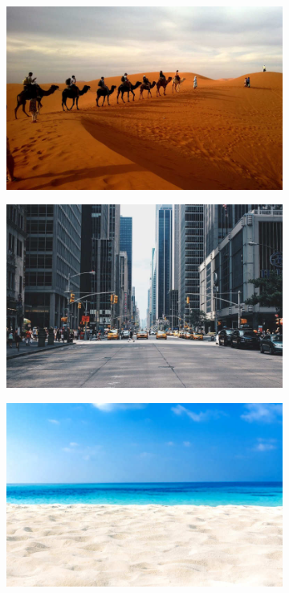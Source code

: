 \begin{figure}[!h]
	\begin{center}
		\begin{subfigure}[h]{0.24\textwidth}
			\centering
			\includegraphics[width=1\textwidth]{"contents/images/06-img-desert"}
		\end{subfigure}
		\hfill
		\begin{subfigure}[h]{0.24\textwidth}
			\centering
			\includegraphics[width=1\textwidth]{"contents/images/06-img-street"}
		\end{subfigure}
		\hfill
		\begin{subfigure}[h]{0.24\textwidth}
			\centering
			\includegraphics[width=1\textwidth]{"contents/images/06-img-beach"}

\end{subfigure}
\end{center}
\end{figure}
